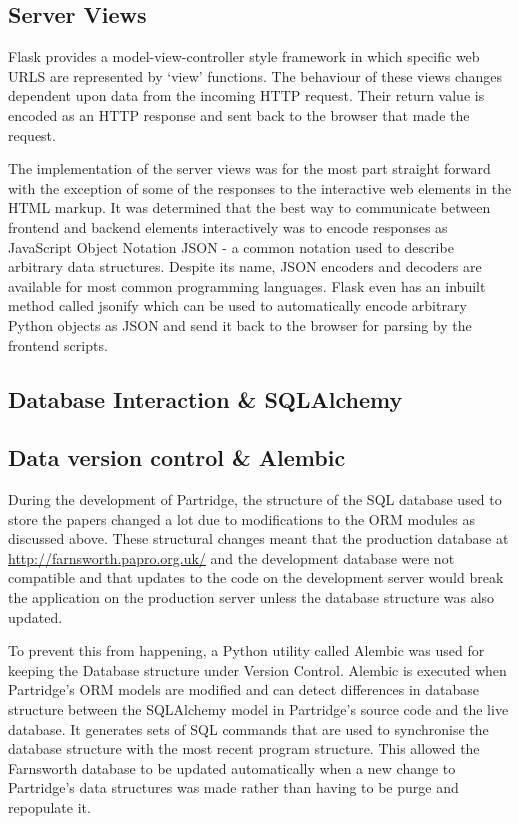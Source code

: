 \subsection{ Server Views }

Flask provides a model-view-controller style framework in which specific web
URLS are represented by `view' functions. The behaviour of these views changes
dependent upon data from the incoming HTTP request. Their return value is
encoded as an HTTP response and sent back to the browser that made the request.

The implementation of the server views was for the most part straight forward
with the exception of some of the responses to the interactive web elements in
the HTML markup. It was determined that the best way to communicate between
frontend and backend elements interactively was to encode responses as
JavaScript Object Notation JSON - a common notation used to describe arbitrary
data structures\cite{jsonRFC}. Despite its name, JSON encoders and decoders are available for
most common programming languages.  Flask even has an inbuilt method called
jsonify which can be used to automatically encode arbitrary Python objects as
JSON and send it back to the browser for parsing by the frontend scripts.

\subsection{Database Interaction \& SQLAlchemy}

\subsection{Data version control \& Alembic}

During the development of Partridge, the structure of the SQL database used to
store the papers changed a lot due to modifications to the ORM modules as
discussed above. These structural changes meant that the production database at
\url{http://farnsworth.papro.org.uk/} and the development database were not
compatible and that updates to the code on the development server would break
the application on the production server unless the database structure was also
updated. 

To prevent this from happening, a Python utility called
Alembic\cite{alembic2013} was used for keeping the Database structure under
Version Control. Alembic is executed when Partridge's ORM models are modified
and can detect differences in database structure between the SQLAlchemy model
in Partridge's source code and the live database. It generates sets of SQL
commands that are used to synchronise the database structure with the most
recent program structure. This allowed the Farnsworth database to be updated
automatically when a new change to Partridge's data structures was made rather
than having to be purge and repopulate it.


